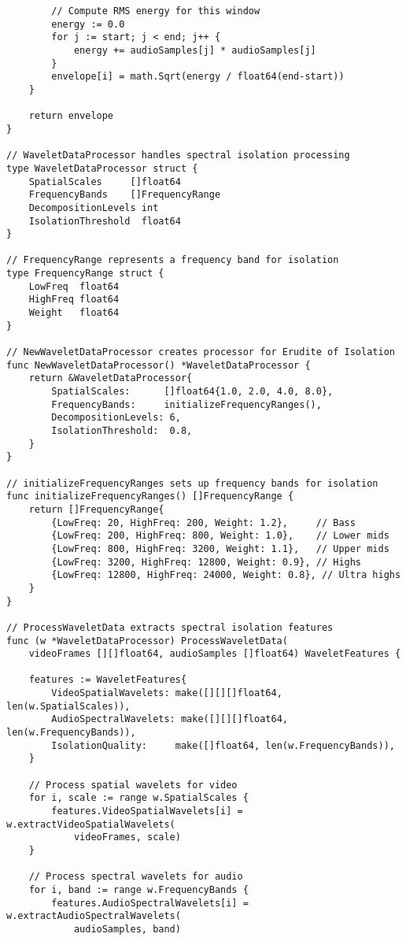 \begin{tcolorbox}[colback=CodeBackground, colframe=DarkGray, title=Video-Audio Dataset Processing, fonttitle=\bfseries]
\begin{verbatim}
        // Compute RMS energy for this window
        energy := 0.0
        for j := start; j < end; j++ {
            energy += audioSamples[j] * audioSamples[j]
        }
        envelope[i] = math.Sqrt(energy / float64(end-start))
    }
    
    return envelope
}

// WaveletDataProcessor handles spectral isolation processing
type WaveletDataProcessor struct {
    SpatialScales     []float64
    FrequencyBands    []FrequencyRange
    DecompositionLevels int
    IsolationThreshold  float64
}

// FrequencyRange represents a frequency band for isolation
type FrequencyRange struct {
    LowFreq  float64
    HighFreq float64
    Weight   float64
}

// NewWaveletDataProcessor creates processor for Erudite of Isolation
func NewWaveletDataProcessor() *WaveletDataProcessor {
    return &WaveletDataProcessor{
        SpatialScales:      []float64{1.0, 2.0, 4.0, 8.0},
        FrequencyBands:     initializeFrequencyRanges(),
        DecompositionLevels: 6,
        IsolationThreshold:  0.8,
    }
}

// initializeFrequencyRanges sets up frequency bands for isolation
func initializeFrequencyRanges() []FrequencyRange {
    return []FrequencyRange{
        {LowFreq: 20, HighFreq: 200, Weight: 1.2},     // Bass
        {LowFreq: 200, HighFreq: 800, Weight: 1.0},    // Lower mids
        {LowFreq: 800, HighFreq: 3200, Weight: 1.1},   // Upper mids
        {LowFreq: 3200, HighFreq: 12800, Weight: 0.9}, // Highs
        {LowFreq: 12800, HighFreq: 24000, Weight: 0.8}, // Ultra highs
    }
}

// ProcessWaveletData extracts spectral isolation features
func (w *WaveletDataProcessor) ProcessWaveletData(
    videoFrames [][]float64, audioSamples []float64) WaveletFeatures {
    
    features := WaveletFeatures{
        VideoSpatialWavelets: make([][][]float64, len(w.SpatialScales)),
        AudioSpectralWavelets: make([][][]float64, len(w.FrequencyBands)),
        IsolationQuality:     make([]float64, len(w.FrequencyBands)),
    }
    
    // Process spatial wavelets for video
    for i, scale := range w.SpatialScales {
        features.VideoSpatialWavelets[i] = w.extractVideoSpatialWavelets(
            videoFrames, scale)
    }
    
    // Process spectral wavelets for audio
    for i, band := range w.FrequencyBands {
        features.AudioSpectralWavelets[i] = w.extractAudioSpectralWavelets(
            audioSamples, band)
        

\end{verbatim}
\end{tcolorbox}
